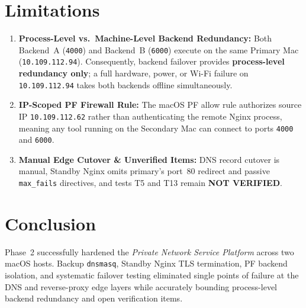 \documentclass[conference]{IEEEtran}
\begin{document}
\section{Limitations}
\begin{enumerate}
    \item \textbf{Process-Level vs.\ Machine-Level Backend Redundancy:} Both Backend~A (\texttt{4000}) and Backend~B (\texttt{6000}) execute on the same Primary Mac (\texttt{10.109.112.94}). Consequently, backend failover provides \textbf{process-level redundancy only}; a full hardware, power, or Wi-Fi failure on \texttt{10.109.112.94} takes both backends offline simultaneously.
    \item \textbf{IP-Scoped PF Firewall Rule:} The macOS PF allow rule authorizes source IP \texttt{10.109.112.62} rather than authenticating the remote Nginx process, meaning any tool running on the Secondary Mac can connect to ports \texttt{4000} and \texttt{6000}.
    \item \textbf{Manual Edge Cutover \& Unverified Items:} DNS record cutover is manual, Standby Nginx omits primary's port~80 redirect and passive \texttt{max\_fails} directives, and tests T5 and T13 remain \textbf{NOT VERIFIED}.
\end{enumerate}

\section{Conclusion}
Phase~2 successfully hardened the \textit{Private Network Service Platform} across two macOS hosts. Backup \texttt{dnsmasq}, Standby Nginx TLS termination, PF backend isolation, and systematic failover testing eliminated single points of failure at the DNS and reverse-proxy edge layers while accurately bounding process-level backend redundancy and open verification items.
\end{document}
